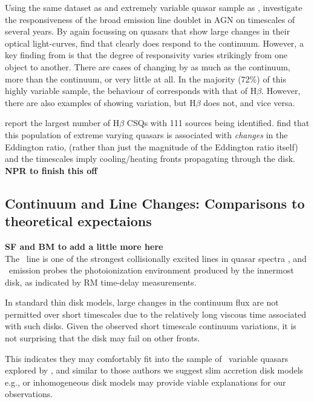 \documentclass[fleqn,usenatbib]{mnras}
\begin{document}
Using the same dataset as and extremely variable quasar sample
as \citet{MacLeod2019}, \citet{Homan2019}
investigate the responsiveness of the \mgii broad emission line
doublet in AGN on timescales of several years.  By again focussing on quasars that show large
changes in their optical light-curves, \citet{Homan2019} find that
\mgii clearly does respond to the continuum.  However, a key finding
from \citet{Homan2019} is that the degree of responsivity varies
strikingly from one object to another.  There are cases of \mgii
changing by as much as the continuum, more than the continuum, or very
little at all.  In the majority (72\%) of this highly variable sample,
the behaviour of \mgii corresponds with that of H$\beta$.  However,
there are also examples of \mgii showing variation, but H$\beta$ does
not, and vice versa.

\citet{Graham2019} report the largest number of H$\beta$ CSQs with 111
sources being identified. \citet{Graham2019} find that this population
of extreme varying quasars is associated with {\it changes} in the
Eddington ratio, (rather than just the magnitude of the Eddington
ratio itself) and the timescales imply cooling/heating fronts
propagating through the disk.\\
{\bf NPR to finish this off} \\


\subsection{Continuum and Line Changes: Comparisons to theoretical expectaions}
{\bf SF and BM to add a little more here}\\
The \civ\ line is one of the strongest collisionally excited lines in quasar spectra \citep[e.g.][]{HamannFerland1999}, and \civ\ emission probes the photoionization environment produced by the innermost disk, as indicated by RM time-delay measurements. 

In standard \citet{SS73} thin disk models, large changes in the continuum flux are not permitted over short timescales due to the relatively long viscous time associated with such disks. Given the observed short timescale continuum variations, it is not surprising that the \citet{SS73} disk may fail on other fronts. %

This indicates they may comfortably fit into the sample of \civ\ variable quasars explored by \citet{Dyer2019}, and similar to those authors we suggest slim accretion disk models e.g., \citet[][]{Abramowicz1988} or inhomogeneous disk models
\citep[e.g.,][]{DexterAgol2011} may provide viable explanations for our observations.
\end{document}

